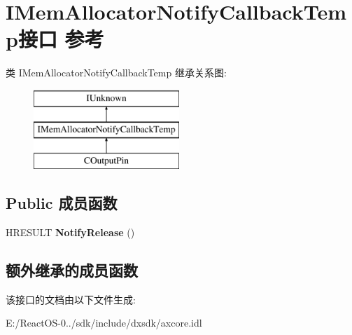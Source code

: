 \hypertarget{interface_i_mem_allocator_notify_callback_temp}{}\section{I\+Mem\+Allocator\+Notify\+Callback\+Temp接口 参考}
\label{interface_i_mem_allocator_notify_callback_temp}
类 I\+Mem\+Allocator\+Notify\+Callback\+Temp 继承关系图\+:\begin{figure}[H]
\begin{center}
\leavevmode
\includegraphics[height=3.000000cm]{interface_i_mem_allocator_notify_callback_temp}
\end{center}
\end{figure}
\subsection*{Public 成员函数}
\begin{DoxyCompactItemize}
\item 
\mbox{\label{interface_i_mem_allocator_notify_callback_temp_a0ae531fd1330bdf0d86f0747f413902d}} 
H\+R\+E\+S\+U\+LT {\bfseries Notify\+Release} ()
\end{DoxyCompactItemize}
\subsection*{额外继承的成员函数}


该接口的文档由以下文件生成\+:\begin{DoxyCompactItemize}
\item 
E\+:/\+React\+O\+S-\/0../sdk/include/dxsdk/axcore.\+idl\end{DoxyCompactItemize}

